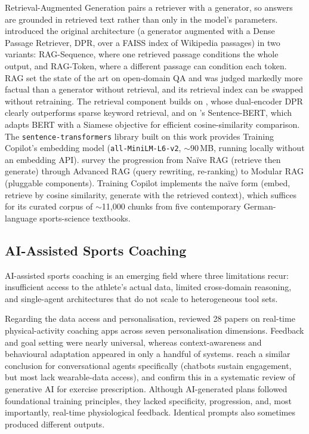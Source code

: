 Retrieval-Augmented Generation pairs a retriever with a generator, so answers are grounded in retrieved text rather than only in the model's parameters. \cite{lewis_retrieval-augmented_2020} introduced the original architecture (a generator augmented with a Dense Passage Retriever, DPR, over a FAISS index of Wikipedia passages) in two variants: RAG-Sequence, where one retrieved passage conditions the whole output, and RAG-Token, where a different passage can condition each token. RAG set the state of the art on open-domain QA and was judged markedly more factual than a generator without retrieval, and its retrieval index can be swapped without retraining. The retrieval component builds on \cite{karpukhin_dense_2020}, whose dual-encoder DPR clearly outperforms sparse keyword retrieval, and on \cite{reimers_sentence-bert_2019}'s Sentence-BERT, which adapts BERT with a Siamese objective for efficient cosine-similarity comparison. The \texttt{sentence-transformers} library built on this work provides Training Copilot's embedding model (\texttt{all-MiniLM-L6-v2}, $\sim$90\,MB, running locally without an embedding API). \cite{gao_retrieval-augmented_2024} survey the progression from Na\"ive RAG (retrieve then generate) through Advanced RAG (query rewriting, re-ranking) to Modular RAG (pluggable components). Training Copilot implements the na\"ive form (embed, retrieve by cosine similarity, generate with the retrieved context), which suffices for its curated corpus of $\sim$11{,}000 chunks from five contemporary German-language sports-science textbooks.

\subsection{AI-Assisted Sports Coaching}\label{sec:sota:coaching}

AI-assisted sports coaching is an emerging field where three limitations recur: insufficient access to the athlete's actual data, limited cross-domain reasoning, and single-agent architectures that do not scale to heterogeneous tool sets.

Regarding the data access and personalisation, \cite{monteiro-guerra_personalization_2020} reviewed 28 papers on real-time physical-activity coaching apps across seven personalisation dimensions. Feedback and goal setting were nearly universal, whereas context-awareness and behavioural adaptation appeared in only a handful of systems. \cite{luo_promoting_2021} reach a similar conclusion for conversational agents specifically (chatbots sustain engagement, but most lack wearable-data access), and \cite{puce_harnessing_2025} confirm this in a systematic review of generative AI for exercise prescription. Although AI-generated plans followed foundational training principles, they lacked specificity, progression, and, most importantly, real-time physiological feedback. Identical prompts also sometimes produced different outputs.

